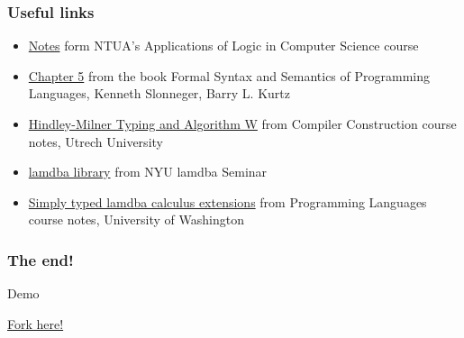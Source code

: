 \documentclass[xcolor=table]{beamer}
\begin{document}
\begin{frame}
\frametitle{Useful links}
\begin{block}
{
\begin{footnotesize}
\begin{itemize}
\item \href{http://www.math.ntua.gr/logic/lamdba/notes/shmeiwseis-2011.pdf}{Notes} form NTUA's Applications of Logic in Computer Science course %
\item \href{http://homepage.cs.uiowa.edu/~slonnegr/plf/Book/Chapter5.pdf}{Chapter 5} from the book Formal Syntax and Semantics of Programming Languages, Kenneth Slonneger, Barry L. Kurtz
\item \href{http://www.cs.uu.nl/wiki/pub/Cco/CourseSchedule/cco-09-typesystems-2x2.pdf}{Hindley-Milner Typing and Algorithm W} from Compiler Construction course notes, Utrech University %
\item \href{http://lamdba.jimpryor.net/lamdba_library/}{lamdba library} from NYU lamdba Seminar %
\item \href{http://homes.cs.washington.edu/~djg/2011sp/lec11_6up.pdf}{Simply typed lamdba calculus extensions} from Programming Languages course notes, University of Washington %
\end{itemize}
\end{footnotesize}
}

\end{block}
\end{frame}

\begin{frame}
\frametitle{The end!}
\begin{block}
{\begin{center}
{\large Demo}
\end{center}}
\begin{center}
 \href{https://github.com/zoep/jebus}{Fork here!}
 \end{center} 
\end{block}
\end{frame}
\end{document}
